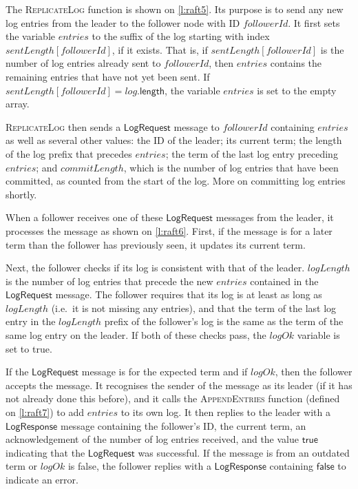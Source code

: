 The \textsc{ReplicateLog} function is shown on \autoref{l:raft5}.
Its purpose is to send any new log entries from the leader to the follower node with ID $\mathit{followerId}$.
It first sets the variable $\mathit{entries}$ to the suffix of the log starting with index $\mathit{sentLength}[\mathit{followerId}]$, if it exists.
That is, if $\mathit{sentLength}[\mathit{followerId}]$ is the number of log entries already sent to $\mathit{followerId}$, then $\mathit{entries}$ contains the remaining entries that have not yet been sent.
If $\mathit{sentLength}[\mathit{followerId}] = \mathit{log}.\mathsf{length}$, the variable $\mathit{entries}$ is set to the empty array.

\textsc{ReplicateLog} then sends a $\mathsf{LogRequest}$ message to $\mathit{followerId}$ containing $\mathit{entries}$ as well as several other values: the ID of the leader; its current term; the length of the log prefix that precedes $\mathit{entries}$; the term of the last log entry preceding $\mathit{entries}$; and $\mathit{commitLength}$, which is the number of log entries that have been committed, as counted from the start of the log.
More on committing log entries shortly.

When a follower receives one of these $\mathsf{LogRequest}$ messages from the leader, it processes the message as shown on \autoref{l:raft6}.
First, if the message is for a later term than the follower has previously seen, it updates its current term.

Next, the follower checks if its log is consistent with that of the leader.
$\mathit{logLength}$ is the number of log entries that precede the new $\mathit{entries}$ contained in the $\mathsf{LogRequest}$ message.
The follower requires that its log is at least as long as $\mathit{logLength}$ (i.e.\ it is not missing any entries), and that the term of the last log entry in the $\mathit{logLength}$ prefix of the follower's log is the same as the term of the same log entry on the leader.
If both of these checks pass, the $\mathit{logOk}$ variable is set to true.

If the $\mathsf{LogRequest}$ message is for the expected term and if $\mathit{logOk}$, then the follower accepts the message.
It recognises the sender of the message as its leader (if it has not already done this before), and it calls the \textsc{AppendEntries} function (defined on \autoref{l:raft7}) to add $\mathit{entries}$ to its own log.
It then replies to the leader with a $\mathsf{LogResponse}$ message containing the follower's ID, the current term, an acknowledgement of the number of log entries received, and the value $\mathsf{true}$ indicating that the $\mathsf{LogRequest}$ was successful.
If the message is from an outdated term or $\mathit{logOk}$ is false, the follower replies with a $\mathsf{LogResponse}$ containing $\mathsf{false}$ to indicate an error.

